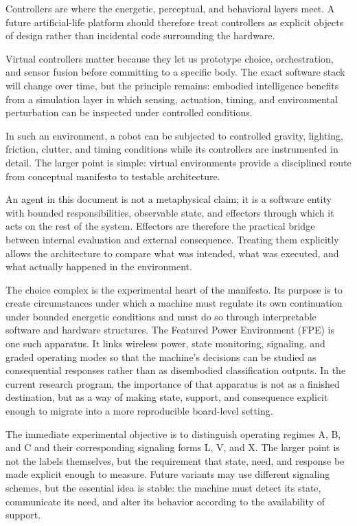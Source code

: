 \documentclass[a4paper,english]{article}
\begin{document}
Controllers are where the energetic, perceptual, and behavioral layers
meet. A future artificial-life platform should therefore treat controllers
as explicit objects of design rather than incidental code surrounding
the hardware.

Virtual controllers matter because they let us prototype choice, orchestration,
and sensor fusion before committing to a specific body. The exact software
stack will change over time, but the principle remains: embodied intelligence
benefits from a simulation layer in which sensing, actuation, timing,
and environmental perturbation can be inspected under controlled conditions.

In such an environment, a robot can be subjected to controlled gravity,
lighting, friction, clutter, and timing conditions while its controllers
are instrumented in detail. The larger point is simple: virtual environments
provide a disciplined route from conceptual manifesto to testable
architecture.

An agent in this document is not a metaphysical claim; it is a software
entity with bounded responsibilities, observable state, and effectors
through which it acts on the rest of the system. Effectors are therefore
the practical bridge between internal evaluation and external consequence.
Treating them explicitly allows the architecture to compare what was
intended, what was executed, and what actually happened in the environment.

The choice complex is the experimental heart of the manifesto. Its
purpose is to create circumstances under which a machine must regulate
its own continuation under bounded energetic conditions and must do
so through interpretable software and hardware structures. The Featured
Power Environment (FPE) is one such apparatus. It links wireless power,
state monitoring, signaling, and graded operating modes so that the
machine's decisions can be studied as consequential responses rather
than as disembodied classification outputs.
In the current research program, the importance of that apparatus is
not as a finished destination, but as a way of making state, support,
and consequence explicit enough to migrate into a more reproducible
board-level setting.

The immediate experimental objective is to distinguish operating regimes
A, B, and C and their corresponding signaling forms L, V, and X.
The larger point is not the labels themselves, but the requirement
that state, need, and response be made explicit enough to measure.
Future variants may use different signaling schemes, but the essential
idea is stable: the machine must detect its state, communicate its
need, and alter its behavior according to the availability of support.
\end{document}
